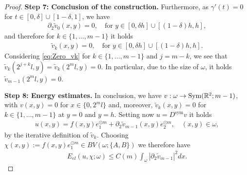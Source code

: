 \documentclass[a4paper, 10pt, twoside, notitlepage]{amsart}
\theoremstyle{plain}
\newcommand{\R}{\mathbb{R}}
\newcommand{\p}{\partial}
\newcommand{\Ds}{D^{\text{sym}}}
\begin{document}
\begin{proof}
                          \textbf{Step 7: Conclusion of the construction.}
                          Furthermore, as $\gamma'(t) = 0$ for $t \in [0,\delta] \cup [1-\delta,1]$, we have
                          \begin{align*}
                            \p_2 \tilde{v}_0(x,y) = 0, \quad \text{for } y \in [0,\delta h] \cup [(1-\delta)h,h],
                          \end{align*}
                          and therefore for $k\in\{1,\dots,m-1\}$ it holds
                          \begin{align*}
                            \tilde{v}_k(x,y) = 0, \quad \text{for } y \in [0,\delta h] \cup [(1-\delta)h, h].
                          \end{align*}
                          Considering \cref{eq:Zero_vk} for $k \in \{ 1,\dots,m-1\}$ and $j=m-k$, we see that $\tilde{v}_{k}(2^{j+k}l,y) = \tilde{v}_k(2^ml,y) = 0$. In particular, due to the size of $\omega$, it holds $\tilde{v}_{m-1}(2^m l,y) = 0$.
                          




                      
                          \textbf{Step 8: Energy estimates.}
                          In conclusion, we have $v: \omega \to \textup{Sym}(\R^2;m-1)$, with $v(x,y) = 0$ for $x\in\{0,2^ml\}$ and, moreover, $\tilde{v}_k(x,y) = 0$ for $k\in \{1,\dots,m-1\}$ at $y=0$ and $y=h$.
                          Setting now $u = \Ds v$ it holds
                          \begin{align*}
                            u(x,y) =  f(x,y) e_1^{\odot m} + \p_2 \tilde{v}_{m-1}(x,y) e_2^{\odot m}, \quad (x,y) \in \omega,
                          \end{align*}
                            by the iterative definition of $\tilde{v}_k$.
                            Choosing $\chi(x,y) := f(x,y) e_1^{\odot m} \in BV(\omega;\{A,B\})$ we therefore have
                            \begin{align}\label{eq:IntermediateBoundElastic}
                              E_{el}(u,\chi;\omega) \leq C(m) \int_\omega |\p_2 \tilde{v}_{m-1}|^2 dx.
                            \end{align}
                          


\end{proof}
\end{document}
